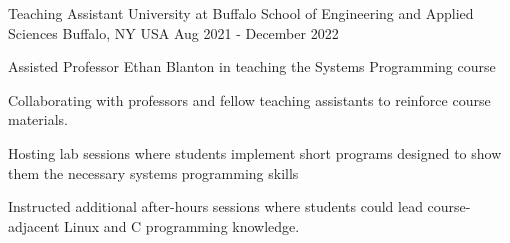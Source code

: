 \begin{cventries}
  \cventry
    {Teaching Assistant} %
    {University at Buffalo School of Engineering and Applied Sciences} %
    {Buffalo, NY USA} %
    {Aug 2021 - December 2022} %
    {
      \begin{cvitems} %
        \item Assisted Professor Ethan Blanton in teaching the Systems Programming course
        \item Collaborating with professors and fellow teaching assistants to reinforce course materials.
        \item Hosting lab sessions where students implement short programs designed to show them the necessary systems programming skills
        \item Instructed additional after-hours sessions where students could lead course-adjacent Linux and C programming knowledge.
      \end{cvitems}
    }

\end{cventries}
